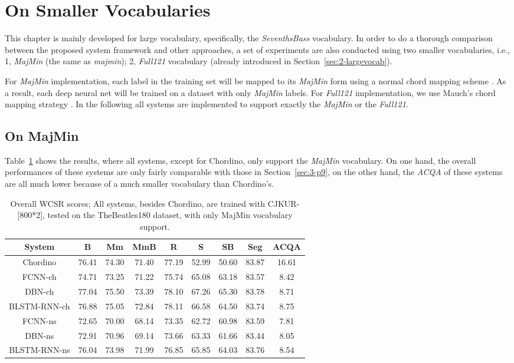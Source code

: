 \section{On Smaller Vocabularies}
This chapter is mainly developed for large vocabulary, specifically, the \textit{SeventhsBass} vocabulary. In order to do a thorough comparison between the proposed system framework and other approaches, a set of experiments are also conducted using two smaller vocabularies, i.e., 1, \textit{MajMin} (the same as \textit{majmin}); 2, \textit{Full121} vocabulary (already introduced in Section~\ref{sec:2-largevocab}).

For \textit{MajMin} implementation, each label in the training set will be mapped to its \textit{MajMin} form using a normal chord mapping scheme \cite{harte2010towards,pauwels2013evaluating}. As a result, each deep neural net will be trained on a dataset with only \textit{MajMin} labels. For \textit{Full121} implementation, we use Mauch's chord mapping strategy \cite{mauch2010automatic}. In the following all systems are implemented to support exactly the \textit{MajMin} or the \textit{Full121}.

\subsection{On MajMin}
Table~\ref{tab:3-overallres} shows the results, where all systems, except for Chordino, only support the \textit{MajMin} vocabulary. On one hand, the overall performances of these systems are only fairly comparable with those in Section~\ref{sec:3-p9}, on the other hand, the \textit{ACQA} of these systems are all much lower because of a much smaller vocabulary than Chordino's.
\begin{table}[h!]
\scriptsize
\centering
\begin{tabular}{|c|c|c|c|c|c|c|c|c|}\hline
System & B & Mm & MmB & R & S & SB & Seg & ACQA \\ \hline
Chordino & 76.41 & 74.30 & 71.40 & 77.19 & 52.99 & 50.60 & 83.87 & 16.61\\ \hline
FCNN-ch & 74.71 & 73.25 & 71.22 & 75.74 & 65.08 & 63.18 & 83.57 & 8.42\\ \hline
DBN-ch & 77.04 & 75.50 & 73.39 & 78.10 & 67.26 & 65.30 & 83.78 & 8.71\\ \hline
BLSTM-RNN-ch & 76.88 & 75.05 & 72.84 & 78.11 & 66.58 & 64.50 & 83.74 & 8.75\\ \hline
FCNN-ns & 72.65 & 70.00 & 68.14 & 73.35 & 62.72 & 60.98 & 83.59 & 7.81\\ \hline
DBN-ns & 72.91 & 70.96 & 69.14 & 73.66 & 63.33 & 61.66 & 83.44 & 8.05\\ \hline
BLSTM-RNN-ns & 76.04 & 73.98 & 71.99 & 76.85 & 65.85 & 64.03 & 83.76 & 8.54\\ \hline
\end{tabular}
\caption{Overall WCSR scores; All systems, besides Chordino, are trained with CJKUR-[800*2], tested on the TheBeatles180 dataset, with only MajMin vocabulary support.}
\label{tab:3-overallres}
\end{table}

